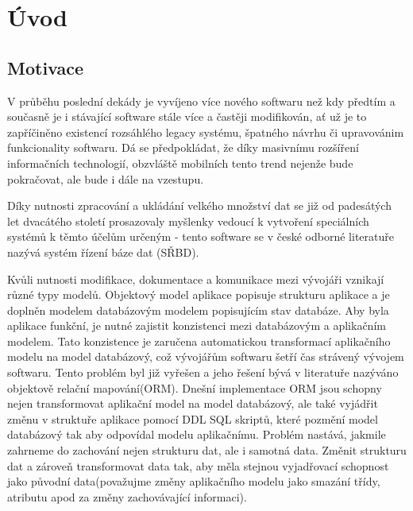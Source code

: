 \documentclass[11pt,twoside,a4paper]{book}
\begin{document}
\listoftables



\mainbodystarts


% 
% 

\chapter{Úvod}
\section{Motivace}

V průběhu poslední dekády je vyvíjeno více nového softwaru než kdy předtím a
současně je i stávající software stále více a častěji modifikován, ať už
je to zapříčiněno  existencí rozsáhlého legacy systému, špatného návrhu či
upravovánim funkcionality softwaru. Dá se předpokládat, že díky masivnímu
rozšíření informačních technologií, obzvláště mobilních tento trend nejenže bude
pokračovat, ale bude i dále na vzestupu.

Díky nutnosti zpracování a ukládání velkého množství dat se již od padesátých
let dvacátého století prosazovaly myšlenky vedoucí k vytvoření speciálních
systémů k těmto účelům určeným - tento software se v české odborné literatuře
nazývá systém řízení báze dat (SŘBD). 

Kvůli nutnosti modifikace, dokumentace a komunikace mezi vývojáři vznikají různé
typy modelů. Objektový model aplikace popisuje strukturu aplikace a je doplněn
modelem databázovým modelem popisujícím stav databáze. Aby byla aplikace
funkční, je nutné zajistit konzistenci mezi databázovým a aplikačním modelem.
Tato konzistence je zaručena automatickou transformací aplikačního modelu na
model databázový, což vývojářům softwaru šetří čas strávený vývojem softwaru.
Tento problém byl již vyřešen a jeho řešení bývá v literatuře nazýváno objektově
relační mapování(ORM). Dnešní implementace ORM jsou schopny nejen transformovat
aplikační model na model databázový, ale také vyjádřit změnu v struktuře
aplikace pomocí DDL SQL skriptů, které pozmění model databázový tak aby
odpovídal modelu aplikačnímu. Problém nastává, jakmile zahrneme do zachování
nejen strukturu dat, ale i samotná data. Změnit strukturu dat a zároveň
transformovat data tak, aby měla stejnou vyjadřovací schopnost jako původní
data(považujme změny aplikačního modelu jako smazání třídy, atributu apod za
změny zachovávající informaci).
\end{document}
